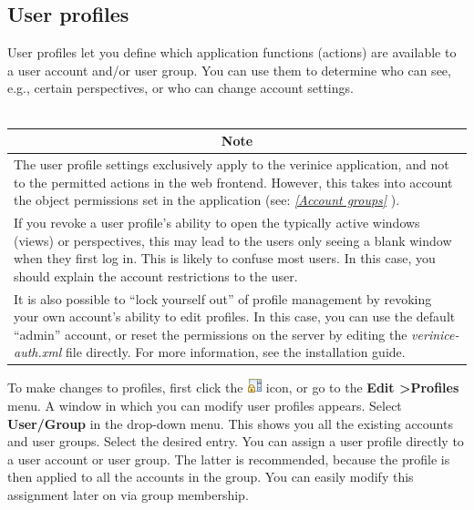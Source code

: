 \documentclass[a4paper,10pt]{book}
\begin{document}
\subsection{User profiles} \label{sec:User-profiles}
User profiles let you define which application functions (actions) are available to a user account and/or user group.
You can use them to determine who can see, e.g., certain perspectives, or who can change account settings.
\newline\\\
\begin{longtable}{| p{} |}
\hline
\multicolumn{1}{|c|}{\textbf{Note}} \\[10pt]
\hline\hline
The user profile settings exclusively apply to the verinice application, and not to the permitted actions in the web frontend. However, this takes into account the object permissions set in the application (see: {\em \ref{Account groups} \nameref{Account groups}}). \\[10pt] \hline
If you revoke a user profile's ability to open the typically active windows (views) or perspectives, this may lead to the users only seeing a blank window when they first log in. This is likely to confuse most users. In this case, you should explain the account restrictions to the user. \\[10pt] \hline
It is also possible to ``lock yourself out'' of profile management by revoking your own account's ability to edit profiles. In this case, you can use the default ``admin'' account, or reset the permissions on the server by editing the \textit{verinice-auth.xml} file directly. For more information, see the installation guide. \\[10pt] \hline
\end{longtable}
To make changes to profiles, first click the \includegraphics[height=2ex]{Icon/Berechtigungsprofile.png} icon,
or go to the \textbf{Edit \textgreater Profiles} menu. A window in which you can modify user profiles appears. Select
\textbf{User/Group} in the drop-down menu. This shows you all the existing accounts and user groups. Select the
desired entry. You can assign a user profile directly to a user account or user group. The latter is recommended,
because the profile is then applied to all the accounts in the group. You can easily modify this assignment later
on via group membership.
\newline
\end{document}
